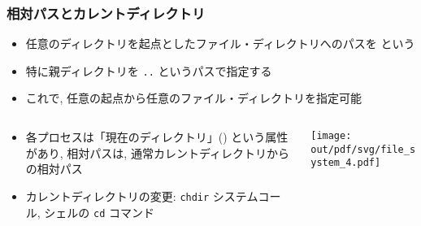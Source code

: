 \documentclass[12pt,dvipdfmx]{beamer}
\begin{document}
\begin{frame}
  \frametitle{相対パスとカレントディレクトリ}
  \begin{itemize}
  \item 任意のディレクトリを起点としたファイル・ディレクトリへのパスを
    という
  \item 特に親ディレクトリを {\tt ..} というパスで指定する
  \item これで, 任意の起点から任意のファイル・ディレクトリを指定可能
  \end{itemize}
  \begin{columns}
    \begin{column}{0.60\textwidth}
      \begin{itemize}
      \item 各プロセスは「現在のディレクトリ」()
        という属性があり, 相対パスは, 通常カレントディレクトリからの相対パス
      \item カレントディレクトリの変更: {\tt chdir} システムコール,
        シェルの {\tt cd} コマンド
      \end{itemize}
    \end{column}
    \begin{column}{0.40\textwidth}
      \begin{center}
        \texttt{[image: out/pdf/svg/file\_system\_4.pdf]}
      \end{center}
    \end{column}
  \end{columns}
\end{frame}
\end{document}
